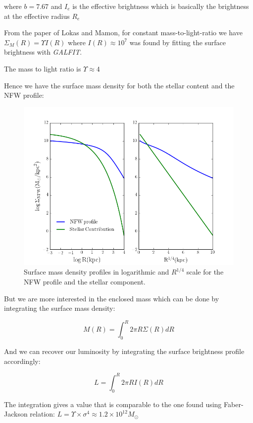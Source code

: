 where $b=7.67$ and $I_{e}$ is the effective brightness which is basically the brightness at the effective radius $R_{e}$

From the paper of Lokas and Mamon, for constant mass-to-light-ratio we have $\Sigma_{M}(R)= \Upsilon I(R)$ where $I(R)\approx 10^{7}$ was found by fitting the surface brightness with \textit{GALFIT}.

The mass to light ratio is $\Upsilon\approx 4$

Hence we have the surface mass density for both the stellar content and the NFW profile:

\begin{figure}[H]
\centering
\includegraphics[width=12cm]{images/Surface_mass_density_log.png}
\caption[Surface mass density profiles]{Surface mass density profiles in logarithmic and $R^{1/4}$ scale for the NFW profile and the stellar component.}
\end{figure}

But we are more interested in the enclosed mass which can be done by integrating the surface mass density:

\begin{equation}
M(R)=\int_{0}^{R}2\pi R\Sigma(R)dR
\end{equation}

And we can recover our luminosity by integrating the surface brightness profile accordingly:

\begin{equation}
L=\int_{0}^{R}2\pi RI(R)dR
\end{equation}

The integration gives a value that is comparable to the one found using Faber-Jackson relation: $L=\Upsilon\times\sigma^{4}\approx 1.2\times 10^{12}M_{\odot}$

